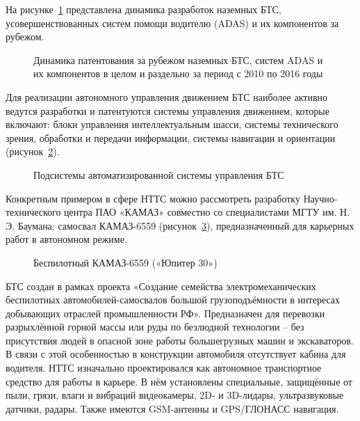 На рисунке~\cref{fig:patent} представлена динамика разработок наземных БТС, усовершенствованных систем помощи водителю (ADAS) и их компонентов за рубежом.

\begin{figure}[ht]
    \caption{Динамика патентования за рубежом наземных БТС, систем ADAS и их компонентов в целом и раздельно за период с 2010 по 2016 годы}\label{fig:patent}
\end{figure}

Для реализации автономного управления движением БТС наиболее активно ведутся разработки и патентуются системы управления движением, которые включают: блоки управления интеллектуальным шасси, системы технического зрения, обработки и передачи информации, системы навигации и ориентации (рисунок~\cref{fig:system}). 

\begin{figure}[ht]
    \caption{Подсистемы автоматизированной системы управления БТС}\label{fig:system}
\end{figure}

Конкретным примером в сфере НТТС можно рассмотреть разработку Научно-технического центра ПАО «КАМАЗ» совместно со специалистами МГТУ им. Н. Э. Баумана: самосвал КАМАЗ-6559 (рисунок~\cref{fig:ypiter30}), предназначенный для карьерных работ в автономном режиме.

\begin{figure}[ht]
    \caption{Беспилотный КАМАЗ-6559 («Юпитер 30»)}\label{fig:ypiter30}
\end{figure}

БТС создан в рамках проекта «Создание семейства электромеханических беспилотных автомобилей-самосвалов большой грузоподъёмности в интересах добывающих отраслей промышленности РФ». Предназначен для перевозки разрыхлённой горной массы или руды по безлюдной технологии – без присутствия людей в опасной зоне работы большегрузных машин и экскаваторов. В связи с этой особенностью в конструкции автомобиля отсутствует кабина для водителя. НТТС изначально проектировался как автономное транспортное средство для работы в карьере. В нём установлены специальные, защищённые от пыли, грязи, влаги и вибраций видеокамеры, 2D- и 3D-лидары, ультразвуковые датчики, радары. Также имеются GSM-антенны и GPS/ГЛОНАСС навигация.

